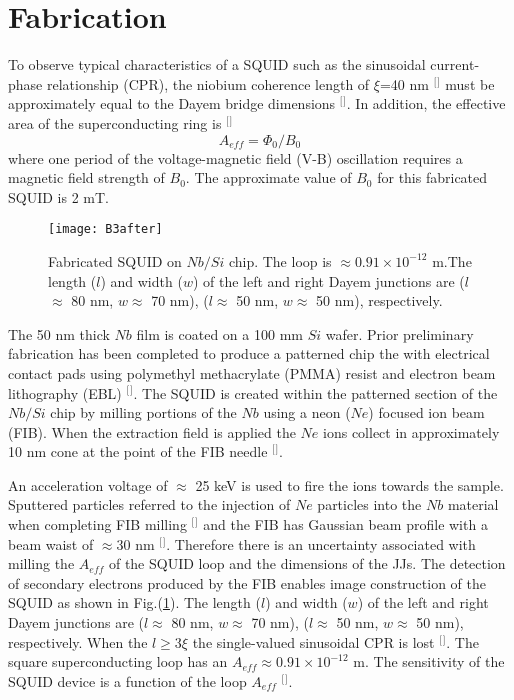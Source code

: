 \section{\label{sec:level1}Fabrication}
To observe typical characteristics of a SQUID such as the sinusoidal current-phase relationship (CPR), the niobium coherence length of $\xi$=40 nm  $^[$\citep{Clarke2005TheHandbook}${}^]$ must be approximately equal to the Dayem bridge dimensions $^[$\citep{Hao2015FabricationJunctions}${}^]$. In addition, the effective area of the superconducting ring is $^[$\citep{Troeman2007NanoSQUIDsConstrictions}${}^]$
\begin{equation}
\label{eq:effectivearea}
{A_{eff}} = {\Phi _0}/{B_0}
\end{equation}
where one period of the voltage-magnetic field (V-B) oscillation requires a magnetic field strength of ${B_0}$. The approximate value of $B_0$ for this fabricated SQUID is 2 mT.  

\begin{figure}[b]
\centering
\texttt{[image: B3after]}
\caption{\label{fig:B3after}Fabricated SQUID on $Nb/Si$ chip. The loop is $\approx0.91\times {10^{ - 12}}$ m.The length ($l$) and width ($w$) of the left and right Dayem junctions are ($l$$\approx$ 80 nm, $w\approx$ 70 nm), ($l\approx$ 50 nm, $w$$\approx$ 50 nm), respectively.}
\end{figure}

The 50 nm thick $Nb$ film is coated on a 100 mm $Si$ wafer. Prior preliminary fabrication has been completed to produce a patterned chip the with electrical contact pads using polymethyl methacrylate (PMMA) resist and electron beam lithography (EBL) $^[$\citep{Granata2008AnApplications}${}^]$. The SQUID is created within the patterned section of the $Nb/Si$ chip by milling portions of the $Nb$ using a neon ($Ne$) focused ion beam (FIB). When the extraction field is applied the $Ne$ ions collect in approximately 10 nm cone at the point of the FIB needle $^[$\citep{Giannuzzi1999AScienceDirect_com}${}^]$. 

An acceleration voltage of $\approx$ 25 keV is used to fire the ions towards the sample. Sputtered particles referred to the injection of $Ne$ particles into the $Nb$ material when completing FIB milling
$^[$\citep{Giannuzzi1999AScienceDirect_com}${}^]$ and the FIB has Gaussian beam profile with a beam waist of $\approx$30 nm $^[$\citep{Troeman2007NanoSQUIDsConstrictions}${}^]$. Therefore there is an uncertainty associated with milling the $A_{eff}$ of the SQUID loop and the dimensions of the JJs. The detection of secondary electrons produced by the FIB enables image construction of the SQUID as shown in Fig.(\ref{fig:B3after}). The length ($l$) and width ($w$) of the left and right Dayem junctions are ($l$$\approx$ 80 nm, $w$$\approx$ 70 nm), ($l\approx$ 50 nm, $w$$\approx$ 50 nm), respectively. When the $l\ge3\xi$ the single-valued sinusoidal CPR is lost $^[$\citep{Troeman2007NanoSQUIDsConstrictions}${}^]$. The square superconducting loop has an $A_{eff}\approx0.91\times {10^{ - 12}}$ m. The sensitivity of the SQUID device is a function of the loop $A_{eff}$ $^[$\citep{Granata2008AnApplications}${}^]$.
